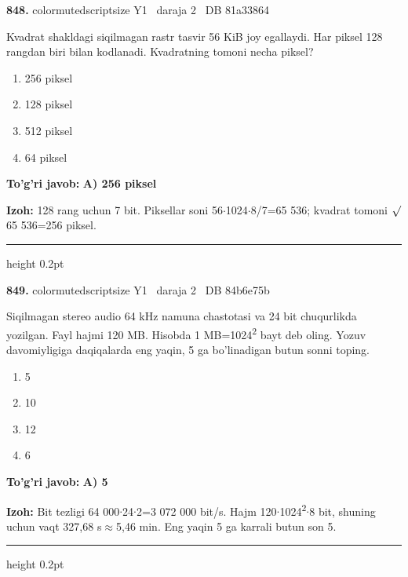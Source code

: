 \documentclass[10pt,a4paper,oneside]{article}
\begin{document}
\noindent\textbf{\color{ink}848.}  {color{muted}scriptsize Y1 \textbullet\ daraja 2 \textbullet\ DB 81a33864}
\par
Kvadrat shakldagi siqilmagan rastr tasvir 56 KiB joy egallaydi. Har piksel 128 rangdan biri bilan kodlanadi. Kvadratning tomoni necha piksel?
\begin{enumerate}[label=\Alph*),leftmargin=9mm]
\item 256 piksel
\item 128 piksel
\item 512 piksel
\item 64 piksel
\end{enumerate}
\begin{tcolorbox}[enhanced,breakable,colback=teal!4,colframe=teal!50!black,boxrule=0.5pt,arc=1.1mm,left=3mm,right=3mm,top=1.7mm,bottom=1.7mm,before skip=2mm,after skip=2mm]
\textbf{\color{teal}To'g'ri javob:} \textbf{A) 256 piksel}
\par\smallskip
\textbf{Izoh:} 128 rang uchun 7 bit. Piksellar soni 56\ensuremath{\cdot}1024\ensuremath{\cdot}8/7=65 536; kvadrat tomoni \ensuremath{\sqrt{\vphantom{x}}}65 536=256 piksel.
\end{tcolorbox}
\vspace{2mm}\hrule height 0.2pt \vspace{3mm}

\noindent\textbf{\color{ink}849.}  {color{muted}scriptsize Y1 \textbullet\ daraja 2 \textbullet\ DB 84b6e75b}
\par
Siqilmagan stereo audio 64 kHz namuna chastotasi va 24 bit chuqurlikda yozilgan. Fayl hajmi 120 MB. Hisobda 1 MB=1024\textsuperscript{2} bayt deb oling. Yozuv davomiyligiga daqiqalarda eng yaqin, 5 ga bo'linadigan butun sonni toping.
\begin{enumerate}[label=\Alph*),leftmargin=9mm]
\item 5
\item 10
\item 12
\item 6
\end{enumerate}
\begin{tcolorbox}[enhanced,breakable,colback=teal!4,colframe=teal!50!black,boxrule=0.5pt,arc=1.1mm,left=3mm,right=3mm,top=1.7mm,bottom=1.7mm,before skip=2mm,after skip=2mm]
\textbf{\color{teal}To'g'ri javob:} \textbf{A) 5}
\par\smallskip
\textbf{Izoh:} Bit tezligi 64 000\ensuremath{\cdot}24\ensuremath{\cdot}2=3 072 000 bit/s. Hajm 120\ensuremath{\cdot}1024\textsuperscript{2}\ensuremath{\cdot}8 bit, shuning uchun vaqt 327,68 s\ensuremath{\approx}5,46 min. Eng yaqin 5 ga karrali butun son 5.
\end{tcolorbox}
\vspace{2mm}\hrule height 0.2pt \vspace{3mm}
\end{document}
